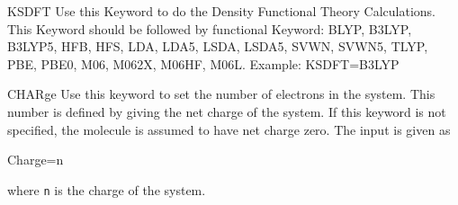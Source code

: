 \begin{keywordlist}
\item[KSDFT]
Use this Keyword to do the Density Functional Theory Calculations.
This Keyword should be followed by functional Keyword:
BLYP, B3LYP, B3LYP5, HFB, HFS, LDA, LDA5, LSDA, LSDA5, SVWN, SVWN5, TLYP, PBE, PBE0, M06, M062X, M06HF, M06L.
Example: KSDFT=B3LYP
\item[CHARge]
Use this keyword to set the number of electrons in the system.
This number is defined by giving the net charge of the system.
If this keyword is not specified, the molecule is assumed to
have net charge zero.
The input is given as
\begin{inputlisting}
Charge=n
\end{inputlisting}
where \verb+n+ is the charge of the system.

\end{keywordlist}
